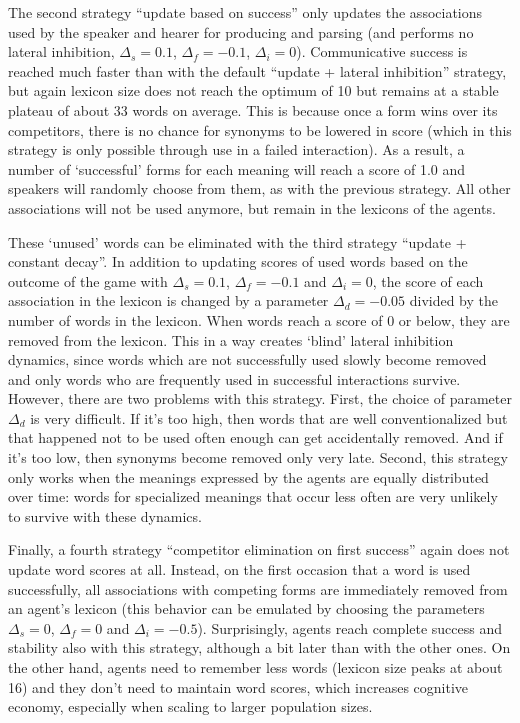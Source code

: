 The second strategy ``update based on success'' only updates the
associations used by the speaker and hearer for producing and parsing
(and performs no lateral inhibition, $\Delta_s=0.1$, $\Delta_f=-0.1$,
$\Delta_i=0$). Communicative success is reached much faster than with
the default ``update + lateral inhibition'' strategy, but again
lexicon size does not reach the optimum of 10 but remains at a stable
plateau of about 33 words on average. This is because once a form wins
over its competitors, there is no chance for synonyms to be lowered in
score (which in this strategy is only possible through use in a failed
interaction). As a result, a number of `successful' forms for each
meaning will reach a score of 1.0 and speakers will randomly choose
from them, as with the previous strategy. All other associations will
not be used anymore, but remain in the lexicons of the agents.

These `unused' words can be eliminated with the third strategy
``update + constant decay''. In addition to updating scores of used
words based on the outcome of the game with $\Delta_s=0.1$,
$\Delta_f=-0.1$ and $\Delta_i=0$, the score of each association in the
lexicon is changed by a parameter $\Delta_d=-0.05$ divided by the
number of words in the lexicon. When words reach a score of 0 or
below, they are removed from the lexicon. This in a way creates
`blind' lateral inhibition dynamics, since words which are not
successfully used slowly become removed and only words who are
frequently used in successful interactions survive. However, there are
two problems with this strategy. First, the choice of parameter
$\Delta_d$ is very difficult. If it's too high, then words that are
well conventionalized but that happened not to be used often enough
can get accidentally removed. And if it's too low, then synonyms
become removed only very late. Second, this strategy only works when
the meanings expressed by the agents are equally distributed over
time: words for specialized meanings that occur less often are very
unlikely to survive with these dynamics.

Finally, a fourth strategy ``competitor elimination on first success''
again does not update word scores at all. Instead, on the first
occasion that a word is used successfully, all associations with
competing forms are immediately removed from an agent's lexicon (this
behavior can be emulated by choosing the parameters $\Delta_s=0$,
$\Delta_f=0$ and $\Delta_i=-0.5$). Surprisingly, agents reach complete
success and stability also with this strategy, although a bit later
than with the other ones. On the other hand, agents need to remember
less words (lexicon size peaks at about 16) and they don't need to
maintain word scores, which increases cognitive economy, especially
when scaling to larger population sizes.\\

